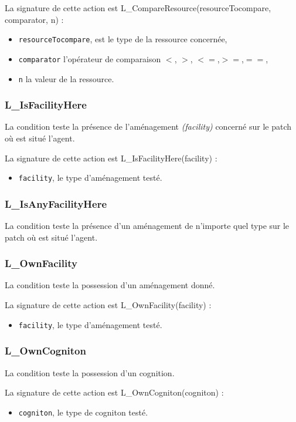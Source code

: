 La signature de cette action est L\_CompareResource(resourceTocompare, comparator, n) :
\begin{itemize}
	\item \texttt{resourceTocompare}, est le type de la ressource concernée,
	\item \texttt{comparator} l'opérateur de comparaison $<$, $>$, $<=$,$ >=$,$ ==$,
	\item \texttt{n} la valeur de la ressource.
	\end{itemize}
	
	
\subsubsection{L\_IsFacilityHere}

La condition teste la présence de l'aménagement \textit{(facility)} concerné sur le patch  où est situé  l'agent.

La signature de cette action est L\_IsFacilityHere(facility) :
\begin{itemize}
	\item \texttt{facility},  le type d'aménagement testé.
	\end{itemize}	
	
\subsubsection{L\_IsAnyFacilityHere}
La condition teste la présence d'un aménagement de n'importe quel type sur le patch  où est situé  l'agent.

\subsubsection{L\_OwnFacility}

La condition teste la possession d'un aménagement donné.

La signature de cette action est L\_OwnFacility(facility) :
\begin{itemize}
	\item \texttt{facility},  le type d'aménagement testé.
	\end{itemize}	
\subsubsection{L\_OwnCogniton}
La condition teste la possession d'un cognition.

La signature de cette action est L\_OwnCogniton(cogniton) :
\begin{itemize}
	\item \texttt{cogniton},  le type de cogniton testé.
	\end{itemize}	
